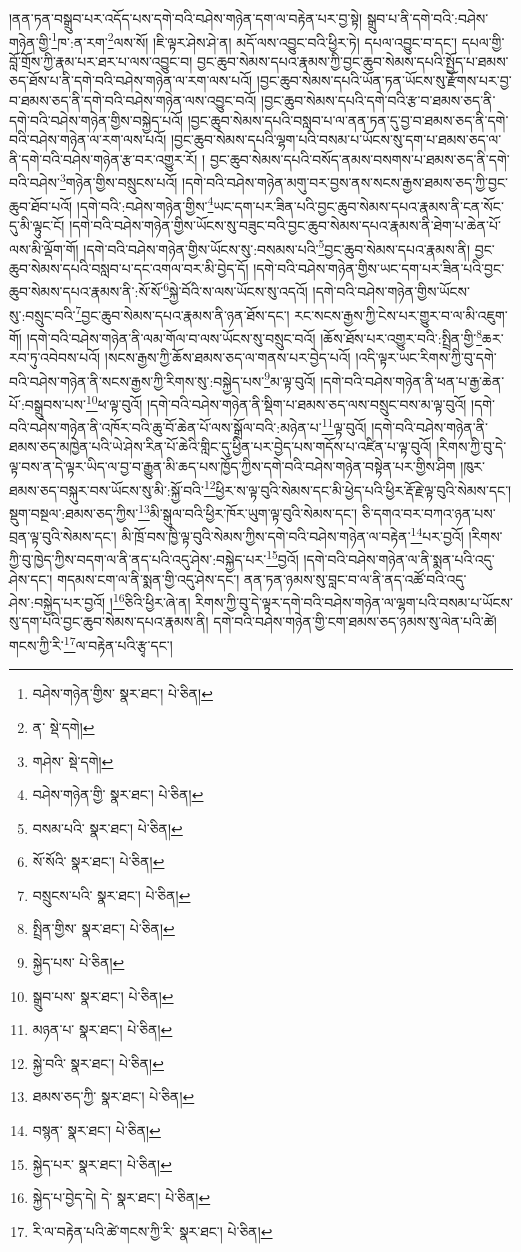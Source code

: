 །ནན་ཏན་བསྒྲུབ་པར་འདོད་པས་དགེ་བའི་བཤེས་གཉེན་དག་ལ་བརྟེན་པར་བྱ་སྟེ། སྒྲུབ་པ་ནི་དགེ་བའི་:བཤེས་གཉེན་གྱི་\footnote{བཤེས་གཉེན་གྱིས་  སྣར་ཐང་།  པེ་ཅིན། }ཁ་:ན་རག་\footnote{ན་  སྡེ་དགེ། }ལས་སོ། །ཇི་ལྟར་ཤེས་ཤེ་ན། མདོ་ལས་འབྱུང་བའི་ཕྱིར་ཏེ། དཔལ་འབྱུང་བ་དང་། དཔལ་གྱི་བློ་གྲོས་ཀྱི་རྣམ་པར་ཐར་པ་ལས་འབྱུང་བ། བྱང་ཆུབ་སེམས་དཔའ་རྣམས་ཀྱི་བྱང་ཆུབ་སེམས་དཔའི་སྤྱོད་པ་ཐམས་ཅད་ཐོས་པ་ནི་དགེ་བའི་བཤེས་གཉེན་ལ་རག་ལས་པའོ། །བྱང་ཆུབ་སེམས་དཔའི་ཡོན་ཏན་ཡོངས་སུ་རྫོགས་པར་བྱ་བ་ཐམས་ཅད་ནི་དགེ་བའི་བཤེས་གཉེན་ལས་འབྱུང་བའོ། །བྱང་ཆུབ་སེམས་དཔའི་དགེ་བའི་རྩ་བ་ཐམས་ཅད་ནི་དགེ་བའི་བཤེས་གཉེན་གྱིས་བསྐྱེད་པའོ། །བྱང་ཆུབ་སེམས་དཔའི་བསླབ་པ་ལ་ནན་ཏན་དུ་བྱ་བ་ཐམས་ཅད་ནི་དགེ་བའི་བཤེས་གཉེན་ལ་རག་ལས་པའོ། །བྱང་ཆུབ་སེམས་དཔའི་ལྷག་པའི་བསམ་པ་ཡོངས་སུ་དག་པ་ཐམས་ཅད་ལ་ནི་དགེ་བའི་བཤེས་གཉེན་རྩ་བར་འགྱུར་རོ། །
བྱང་ཆུབ་སེམས་དཔའི་བསོད་ནམས་བསགས་པ་ཐམས་ཅད་ནི་དགེ་བའི་བཤེས་\footnote{གཤེས་  སྡེ་དགེ། }གཉེན་གྱིས་བསྲུངས་པའོ། །དགེ་བའི་བཤེས་གཉེན་མགུ་བར་བྱས་ནས་སངས་རྒྱས་ཐམས་ཅད་ཀྱི་བྱང་ཆུབ་ཐོབ་པའོ། །དགེ་བའི་:བཤེས་གཉེན་གྱིས་\footnote{བཤེས་གཉེན་གྱི་  སྣར་ཐང་།  པེ་ཅིན། }ཡང་དག་པར་ཟིན་པའི་བྱང་ཆུབ་སེམས་དཔའ་རྣམས་ནི་ངན་སོང་དུ་མི་ལྟུང་ངོ། །དགེ་བའི་བཤེས་གཉེན་གྱིས་ཡོངས་སུ་བཟུང་བའི་བྱང་ཆུབ་སེམས་དཔའ་རྣམས་ནི་ཐེག་པ་ཆེན་པོ་ལས་མི་ལྡོག་གོ། །དགེ་བའི་བཤེས་གཉེན་གྱིས་ཡོངས་སུ་:བསམས་པའི་\footnote{བསམ་པའི་  སྣར་ཐང་།  པེ་ཅིན། }བྱང་ཆུབ་སེམས་དཔའ་རྣམས་ནི། བྱང་ཆུབ་སེམས་དཔའི་བསླབ་པ་དང་འགལ་བར་མི་བྱེད་དོ། །དགེ་བའི་བཤེས་གཉེན་གྱིས་ཡང་དག་པར་ཟིན་པའི་བྱང་ཆུབ་སེམས་དཔའ་རྣམས་ནི་:སོ་སོ་\footnote{སོ་སོའི་  སྣར་ཐང་།  པེ་ཅིན། }སྐྱེ་བོའི་ས་ལས་ཡོངས་སུ་འདའོ། །དགེ་བའི་བཤེས་གཉེན་གྱིས་ཡོངས་སུ་:བསྲུང་བའི་\footnote{བསྲུངས་པའི་  སྣར་ཐང་།  པེ་ཅིན། }བྱང་ཆུབ་སེམས་དཔའ་རྣམས་ནི་ཉན་ཐོས་དང་། རང་སངས་རྒྱས་ཀྱི་ངེས་པར་གྱུར་བ་ལ་མི་འཇུག་གོ། །དགེ་བའི་བཤེས་གཉེན་ནི་ལམ་གོལ་བ་ལས་ཡོངས་སུ་བསྲུང་བའོ། །ཆོས་ཐོས་པར་འགྱུར་བའི་:སྤྲིན་གྱི་\footnote{སྤྲིན་གྱིས་  སྣར་ཐང་།  པེ་ཅིན། }ཆར་རབ་ཏུ་འབེབས་པའོ། །སངས་རྒྱས་ཀྱི་ཆོས་ཐམས་ཅད་ལ་གནས་པར་བྱེད་པའོ། །འདི་ལྟར་ཡང་རིགས་ཀྱི་བུ་དགེ་བའི་བཤེས་གཉེན་ནི་སངས་རྒྱས་ཀྱི་རིགས་སུ་:བསྐྱེད་པས་\footnote{སྐྱེད་པས་  པེ་ཅིན། }མ་ལྟ་བུའོ། །དགེ་བའི་བཤེས་གཉེན་ནི་ཕན་པ་རྒྱ་ཆེན་པོ་:བསྒྲུབས་པས་\footnote{སྒྲུབ་པས་  སྣར་ཐང་།  པེ་ཅིན། }ཕ་ལྟ་བུའོ། །དགེ་བའི་བཤེས་གཉེན་ནི་སྡིག་པ་ཐམས་ཅད་ལས་བསྲུང་བས་མ་ལྟ་བུའོ། །དགེ་བའི་བཤེས་གཉེན་ནི་འཁོར་བའི་ཆུ་བོ་ཆེན་པོ་ལས་སྒྲོལ་བའི་:མཉེན་པ་\footnote{མཉན་པ་  སྣར་ཐང་།  པེ་ཅིན། }ལྟ་བུའོ། །དགེ་བའི་བཤེས་གཉེན་ནི་ཐམས་ཅད་མཁྱེན་པའི་ཡེ་ཤེས་རིན་པོ་ཆེའི་གླིང་དུ་ཕྱིན་པར་བྱེད་པས་གདོས་པ་འཛིན་པ་ལྟ་བུའོ། །རིགས་ཀྱི་བུ་དེ་ལྟ་བས་ན་དེ་ལྟར་ཡིད་ལ་བྱ་བ་རྒྱུན་མི་ཆད་པས་ཁྱོད་ཀྱིས་དགེ་བའི་བཤེས་གཉེན་བསྟེན་པར་གྱིས་ཤིག །ཁུར་ཐམས་ཅད་བསྐུར་བས་ཡོངས་སུ་མི་:སྐྱོ་བའི་\footnote{སྐྱེ་བའི་  སྣར་ཐང་།  པེ་ཅིན། }ཕྱིར་ས་ལྟ་བུའི་སེམས་དང་མི་ཕྱེད་པའི་ཕྱིར་རྡོ་རྗེ་ལྟ་བུའི་སེམས་དང་། སྡུག་བསྔལ་:ཐམས་ཅད་ཀྱིས་\footnote{ཐམས་ཅད་ཀྱི་  སྣར་ཐང་།  པེ་ཅིན། }མི་སྒུལ་བའི་ཕྱིར་ཁོར་ཡུག་ལྟ་བུའི་སེམས་དང་། ཅི་དགའ་བར་བཀའ་ཉན་པས་བྲན་ལྟ་བུའི་སེམས་དང་། མི་ཁྲོ་བས་ཁྱི་ལྟ་བུའི་སེམས་ཀྱིས་དགེ་བའི་བཤེས་གཉེན་ལ་བརྟེན་\footnote{བསྙན་  སྣར་ཐང་།  པེ་ཅིན། }པར་བྱའོ། །རིགས་ཀྱི་བུ་ཁྱེད་ཀྱིས་བདག་ལ་ནི་ནད་པའི་འདུ་ཤེས་:བསྐྱེད་པར་\footnote{སྐྱེད་པར་  སྣར་ཐང་།  པེ་ཅིན། }བྱའོ། །དགེ་བའི་བཤེས་གཉེན་ལ་ནི་སྨན་པའི་འདུ་ཤེས་དང་། གདམས་ངག་ལ་ནི་སྨན་གྱི་འདུ་ཤེས་དང་། ནན་ཏན་ཉམས་སུ་བླང་བ་ལ་ནི་ནད་འཚོ་བའི་འདུ་ཤེས་:བསྐྱེད་པར་བྱའོ། །\footnote{སྐྱེད་པ་བྱེད་དེ། དེ་  སྣར་ཐང་།  པེ་ཅིན། }ཅིའི་ཕྱིར་ཞེ་ན། རིགས་ཀྱི་བུ་དེ་ལྟར་དགེ་བའི་བཤེས་གཉེན་ལ་ལྷག་པའི་བསམ་པ་ཡོངས་སུ་དག་པའི་བྱང་ཆུབ་སེམས་དཔའ་རྣམས་ནི། དགེ་བའི་བཤེས་གཉེན་གྱི་ངག་ཐམས་ཅད་ཉམས་སུ་ལེན་པའི་ཚེ། གངས་ཀྱི་རི་\footnote{རི་ལ་བརྟེན་པའི་ཚེ་གངས་ཀྱི་རི་  སྣར་ཐང་།  པེ་ཅིན། }ལ་བརྟེན་པའི་རྩྭ་དང་། 